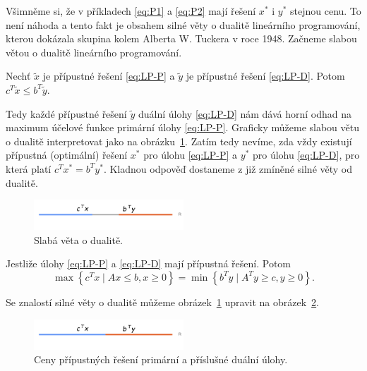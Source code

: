 Všimněme si, že v příkladech \ref{eq:P1} a \ref{eq:P2} mají řešení $x^*$ i $y^*$ stejnou cenu. To není náhoda a tento fakt je obsahem silné věty o dualitě lineárního programování, kterou dokázala skupina kolem Alberta W. Tuckera v roce 1948. Začneme slabou větou o dualitě lineárního programování.

\begin{vt}
    Nechť $\tilde{x}$ je přípustné řešení \ref{eq:LP-P} a $\tilde{y}$ je přípustné řešení \ref{eq:LP-D}. Potom $c^T \tilde{x} \leq b^T \tilde{y}$.
\end{vt}

Tedy každé přípustné řešení $\tilde{y}$ duální úlohy \ref{eq:LP-D} nám dává horní odhad na maximum účelové funkce primární úlohy \ref{eq:LP-P}. Graficky můžeme slabou větu o dualitě interpretovat jako na obrázku~\ref{fig:weak_duality}. Zatím tedy nevíme, zda vždy existují přípustná (optimální) řešení $x^*$ pro úlohu \ref{eq:LP-P} a $y^*$ pro úlohu \ref{eq:LP-D}, pro která platí $c^T x^* = b^T y^*$. Kladnou odpověď dostaneme z již zmíněné silné věty od dualitě.

\begin{figure}[h!]
    \centering
    \includegraphics[width=0.5\textwidth]{img/weak_duality.png}   
    \caption{Slabá věta o dualitě.}
    \label{fig:weak_duality}
\end{figure}

\begin{vt}
    Jestliže úlohy \ref{eq:LP-P} a \ref{eq:LP-D} mají přípustná řešení. Potom
    $$
        \max \left\{ c^T x \mid Ax \leq b, x \geq 0 \right\} = \min \left\{ b^T y \mid A^T y \geq c, y \geq 0 \right\}.
    $$ 
\end{vt}
Se znalostí silné věty o dualitě můžeme obrázek~\ref{fig:weak_duality} upravit na obrázek~\ref{fig:strong_duality}.

\begin{figure}[h!]
    \centering
    \includegraphics[width=0.5\textwidth]{img/strong_duality.png}
    \caption{Ceny přípustných řešení primární a příslušné duální úlohy.}
    \label{fig:strong_duality}
\end{figure}

